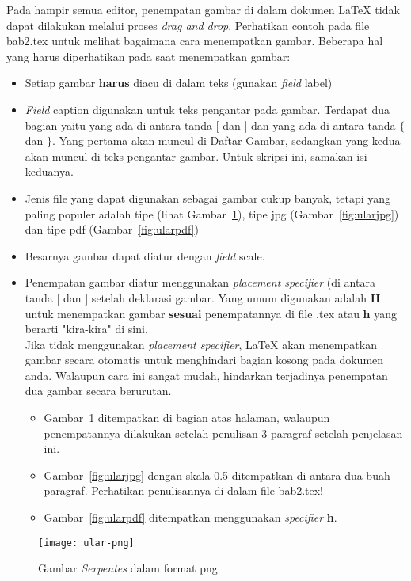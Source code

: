 \begin{enumerate}
Pada hampir semua editor, penempatan gambar di dalam dokumen \LaTeX{} tidak dapat dilakukan melalui proses {\it drag and drop}.
Perhatikan contoh pada file bab2.tex untuk melihat bagaimana cara menempatkan gambar.
Beberapa hal yang harus diperhatikan pada saat menempatkan gambar:
\begin{itemize}
	\item Setiap gambar {\bf harus} diacu di dalam teks (gunakan {\it field} {\sc label})
	\item {\it Field} {\sc caption} digunakan untuk teks pengantar pada gambar. Terdapat dua bagian yaitu yang ada di antara tanda $[$ dan $]$ dan yang ada di antara tanda $\{$ dan $\}$. Yang pertama akan muncul di Daftar Gambar, sedangkan yang kedua akan muncul di teks pengantar gambar. Untuk skripsi ini, samakan isi keduanya.
	\item Jenis file yang dapat digunakan sebagai gambar cukup banyak, tetapi yang paling populer adalah tipe {\sc 
	} (lihat Gambar~\ref{fig:ularpng}), tipe {\sc jpg} (Gambar~\ref{fig:ularjpg}) dan tipe {\sc pdf} (Gambar~\ref{fig:ularpdf})
	\item Besarnya gambar dapat diatur dengan {\it field} {\sc scale}.
	\item Penempatan gambar diatur menggunakan {\it placement specifier} (di antara tanda  $[$ dan $]$ setelah deklarasi gambar.
	Yang umum digunakan adalah {\bf H} untuk menempatkan gambar {\bf sesuai} penempatannya di file .tex atau  {\bf h} yang berarti "kira-kira" di sini. \\
	Jika tidak menggunakan {\it placement specifier}, \LaTeX{} akan menempatkan gambar secara otomatis untuk menghindari bagian kosong pada dokumen anda.
	Walaupun cara ini sangat mudah, hindarkan terjadinya penempatan dua gambar secara berurutan. 	
	\begin{itemize}
		\item Gambar~\ref{fig:ularpng} ditempatkan di bagian atas halaman, walaupun penempatannya dilakukan setelah penulisan 3 paragraf setelah penjelasan ini.
		\item Gambar~\ref{fig:ularjpg} dengan skala 0.5 ditempatkan di antara dua buah paragraf. Perhatikan penulisannya di dalam file bab2.tex!
		\item Gambar~\ref{fig:ularpdf} ditempatkan menggunakan {\it specifier} {\bf h}.
	\end{itemize}
\end{itemize}
 
\begin{figure} 
	\centering  
	\texttt{[image: ular-png]}  
	\caption[Gambar {\it Serpentes} dalam format png]{Gambar {\it Serpentes} dalam format png} 
	\label{fig:ularpng} 
\end{figure} 


\end{enumerate}
